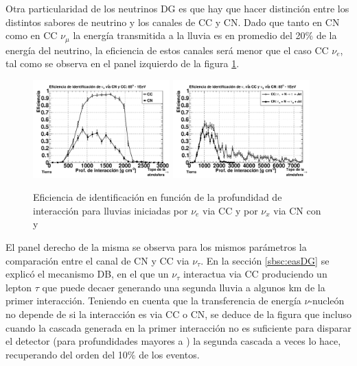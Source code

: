 	Otra particularidad de los neutrinos DG es que hay que hacer distinción entre los distintos sabores de neutrino y los canales de CC y CN.
	Dado que tanto en CN como en CC $\nu_\mu$ la energía transmitida a la lluvia es en promedio del 20$\%$ de la energía del neutrino, la eficiencia de estos canales será menor que el caso CC $\nu_e$, tal como se observa en el panel izquierdo de la figura \ref{fig:effDG_cc_nc}.
	\begin{figure}[h!]
		\begin{center}
			\includegraphics[width=0.47\textwidth]{fig/resultadosAuger/eff_CCvsNC_85}
			\hfill
			\includegraphics[width=0.47\textwidth]{fig/resultadosAuger/eff_tau_1EeV_85}
			\caption{Eficiencia de identificación en función de la profundidad de interacción para lluvias iniciadas por $\nu_e$ via CC y por $\nu_x$ via CN con  y }
			\label{fig:effDG_cc_nc}
		\end{center}
	\end{figure}
	El panel derecho de la misma se observa para los mismos parámetros la comparación entre el canal de CN y CC via $\nu_\tau$.
	En la sección \ref{sbsc:easDG} se explicó el mecanismo DB, en el que un $\nu_\tau$ interactua via CC produciendo un lepton $\tau$ que puede decaer generando una segunda lluvia a algunos km de la primer interacción.
	Teniendo en cuenta que la transferencia de energía $\nu$-nucleón no depende de si la interacción es via CC o CN, se deduce de la figura que incluso cuando la cascada generada en la primer interacción no es suficiente para disparar el detector (para profundidades mayores a ) la segunda cascada a veces lo hace, recuperando del orden del 10$\%$ de los eventos.
	
